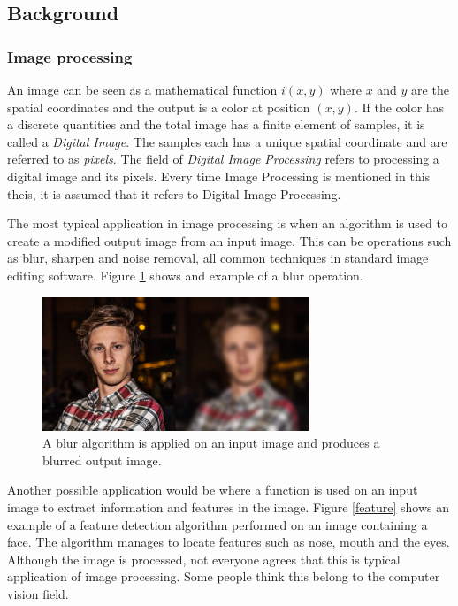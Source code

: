 \subsection{Background}
\subsubsection{Image processing}
An image can be seen as a mathematical function $i(x,y)$ where $x$ and $y$ are the spatial coordinates and the output is a color at position $(x,y)$. If the color has a discrete quantities and the total image has a finite element of samples, it is called a \emph{Digital Image}. The samples each has a unique spatial coordinate and are referred to as \emph{pixels}. The field of \emph{Digital Image Processing} refers to processing a digital image and its pixels. Every time Image Processing is mentioned in this theis, it is assumed that it refers to Digital Image Processing. 
\newline

The most typical application in image processing is when an algorithm is used to create a modified output image from an input image. This can be operations such as blur, sharpen and noise removal, all common techniques in standard image editing software. Figure \ref{lena} shows and example of a blur operation.
\begin{figure}[ht!]
\centering
\includegraphics[width=80mm]{img/klas.png}
\caption{A blur algorithm is applied on an input image and produces a blurred output image.}
\label{lena}
\end{figure}

Another possible application would be where a function is used on an input image to extract information and features in the image. Figure \ref{feature} shows an example of a feature detection algorithm performed on an image containing a face. The algorithm manages to locate features such as nose, mouth and the eyes. Although the image is processed, not everyone agrees that this is typical application of image processing. Some people think this belong to the computer vision field. 


